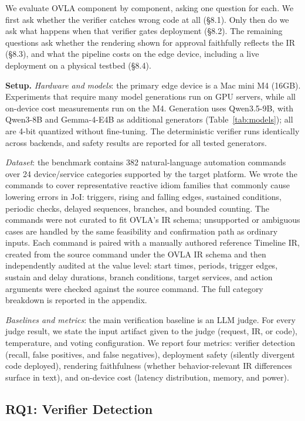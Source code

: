 \documentclass[sigconf,nonacm,anonymous,review]{acmart}
\begin{document}
We evaluate OVLA component by component, asking one question for each. We first ask whether the verifier catches wrong code at all (\S8.1). Only then do we ask what happens when that verifier gates deployment (\S8.2). The remaining questions ask whether the rendering shown for approval faithfully reflects the IR (\S8.3), and what the pipeline costs on the edge device, including a live deployment on a physical testbed (\S8.4).

\textbf{Setup.} \emph{Hardware and models}: the primary edge device is a Mac mini M4 (16GB). Experiments that require many model generations run on GPU servers, while all on-device cost measurements run on the M4. Generation uses Qwen3.5-9B, with Qwen3-8B and Gemma-4-E4B as additional generators (Table~\ref{tab:models}); all are 4-bit quantized without fine-tuning. The deterministic verifier runs identically across backends, and safety results are reported for all tested generators.

\emph{Dataset}: the benchmark contains 382 natural-language automation commands over 24 device/service categories supported by the target platform. We wrote the commands to cover representative reactive idiom families that commonly cause lowering errors in JoI: triggers, rising and falling edges, sustained conditions, periodic checks, delayed sequences, branches, and bounded counting. The commands were not curated to fit OVLA's IR schema; unsupported or ambiguous cases are handled by the same feasibility and confirmation path as ordinary inputs. Each command is paired with a manually authored reference Timeline IR, created from the source command under the OVLA IR schema and then independently audited at the value level: start times, periods, trigger edges, sustain and delay durations, branch conditions, target services, and action arguments were checked against the source command. The full category breakdown is reported in the appendix.

\emph{Baselines and metrics}: the main verification baseline is an LLM judge. For every judge result, we state the input artifact given to the judge (request, IR, or code), temperature, and voting configuration. We report four metrics: verifier detection (recall, false positives, and false negatives), deployment safety (silently divergent code deployed), rendering faithfulness (whether behavior-relevant IR differences surface in text), and on-device cost (latency distribution, memory, and power).

\subsection{RQ1: Verifier Detection}
\end{document}
